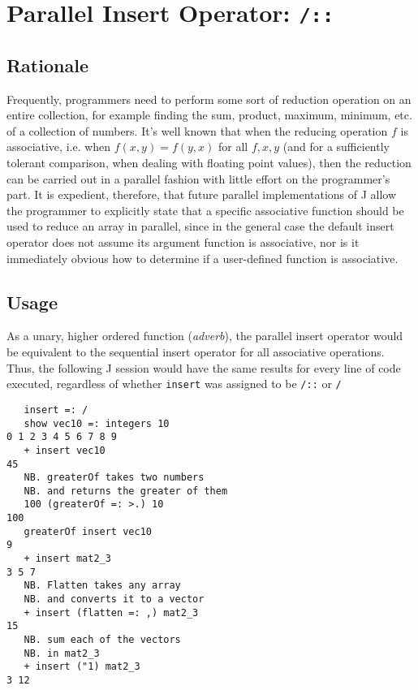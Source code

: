\section{Parallel Insert Operator: \texttt{/::}}
\label{pins}
\subsection{Rationale}
Frequently, programmers need to perform some sort of reduction operation on an entire collection, 
for example finding the sum, product, maximum, minimum, etc. of a collection of numbers.
It's well known that when the reducing operation $f$ is associative, 
i.e. when $f(x,y) = f(y,x)$ for all $f, x, y$ (and for a sufficiently tolerant comparison, when dealing with floating point values),
then the reduction can be carried out in a parallel fashion with little effort on the programmer's part.
It is expedient, therefore, that future parallel implementations of J allow the programmer 
to explicitly state that a specific associative function should be used to reduce an array in parallel, 
since in the general case the default insert operator does not assume its argument function is associative, 
nor is it immediately obvious how to determine if a user-defined function is associative.

\subsection{Usage}
As a unary, higher ordered function (\textit{adverb}), 
the parallel insert operator would be equivalent to the sequential insert operator 
for all associative operations. 
Thus, the following J session would have the same results for every line of code executed, 
regardless of whether \texttt{insert} was assigned to be \texttt{/::} or \texttt{/}
\begin{singlespacing}
\begin{small}
\begin{verbatim}
   insert =: /
   show vec10 =: integers 10
0 1 2 3 4 5 6 7 8 9
   + insert vec10
45
   NB. greaterOf takes two numbers
   NB. and returns the greater of them
   100 (greaterOf =: >.) 10
100
   greaterOf insert vec10
9
   + insert mat2_3
3 5 7
   NB. Flatten takes any array
   NB. and converts it to a vector
   + insert (flatten =: ,) mat2_3
15
   NB. sum each of the vectors
   NB. in mat2_3
   + insert ("1) mat2_3
3 12
\end{verbatim}
\end{small}
\end{singlespacing}

